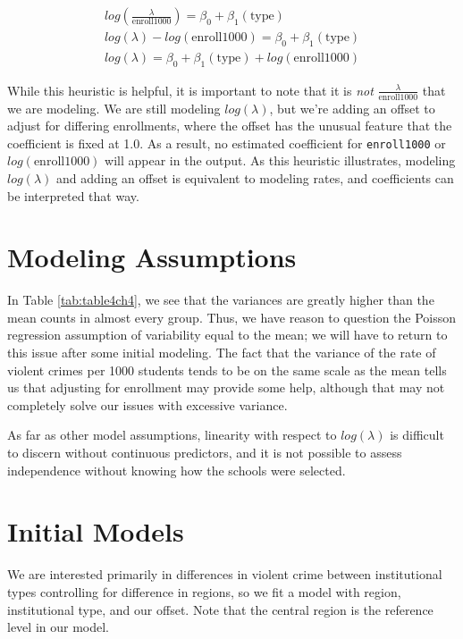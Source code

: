 \documentclass[
]{krantz}
\begin{document}
\begin{align*} 
log(\frac{\lambda}{\textrm{enroll1000}} )= \beta_0 + \beta_1(\textrm{type}) \nonumber \\
log(\lambda)-log(\textrm{enroll1000}) = \beta_0 + \beta_1(\textrm{type}) \nonumber \\
log(\lambda) = \beta_0 + \beta_1(\textrm{type}) + log(\textrm{enroll1000})
\end{align*}

While this heuristic is helpful, it is important to note that it is \emph{not} \(\frac{\lambda}{ \textrm{enroll1000}}\) that we are modeling. We are still modeling \(log(\lambda)\), but we're adding an offset to adjust for differing enrollments, where the offset has the unusual feature that the coefficient is fixed at 1.0. As a result, no estimated coefficient for \texttt{enroll1000} or \(log(\textrm{enroll1000})\) will appear in the output. As this heuristic illustrates, modeling \(log(\lambda)\) and adding an offset is equivalent to modeling rates, and coefficients can be interpreted that way.

\hypertarget{modeling-assumptions}{%
\section{Modeling Assumptions}\label{modeling-assumptions}}

In Table \ref{tab:table4ch4}, we see that the variances are greatly higher than the mean counts in almost every group. Thus, we have reason to question the Poisson regression assumption of variability equal to the mean; we will have to return to this issue after some initial modeling. The fact that the variance of the rate of violent crimes per 1000 students tends to be on the same scale as the mean tells us that adjusting for enrollment may provide some help, although that may not completely solve our issues with excessive variance.

As far as other model assumptions, linearity with respect to \(log(\lambda)\) is difficult to discern without continuous predictors, and it is not possible to assess independence without knowing how the schools were selected.

\hypertarget{initial-models}{%
\section{Initial Models}\label{initial-models}}

We are interested primarily in differences in violent crime between institutional types controlling for difference in regions, so we fit a model with region, institutional type, and our offset. Note that the central region is the reference level in our model.
\end{document}

